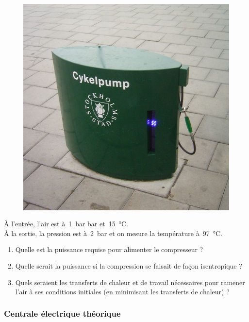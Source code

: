 	\begin{figure}[htp] %
		\begin{center}
			\includegraphics[width=0.6\columnwidth]{images/stockholm_pump.jpg}
		\end{center}
		\label{fig_pompe_stockholm}
	\end{figure}

	À l’entrée, l’air est  à~\SI{1}{\bar} bar et~\SI{15}{\degreeCelsius}.\\
	À la sortie, la pression est à~\SI{2}{\bar} et on mesure la température à~\SI{97}{\degreeCelsius}.

	\begin{enumerate}
		\item Quelle est la puissance requise pour alimenter le compresseur ?
		\item Quelle serait la puissance si la compression se faisait de façon isentropique ?
		\item Quels seraient les transferts de chaleur et de travail nécessaires pour ramener l’air à ses conditions initiales (en minimisant les transferts de chaleur) ?
	\end{enumerate}

\subsubsection{Centrale électrique théorique}
\label{exo_cycle_carnot_vapeur}
	
